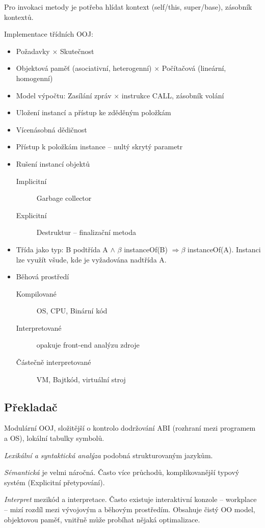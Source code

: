 \documentclass[a4paper, 11pt]{report}
\begin{document}
Pro invokaci metody je potřeba hlídat kontext (self/this, super/base), zásobník kontextů.

Implementace třídních OOJ:
\begin{itemize}
	\item Požadavky $\times$ Skutečnost
	\item Objektová paměť (asociativní, heterogenní) $\times$ Počítačová (lineární, homogenní)
	\item Model výpočtu: Zasílání zpráv $\times$ instrukce CALL, zásobník volání
	\item Uložení instancí a přístup ke zděděným položkám
	\item Vícenásobná dědičnost
	\item Přístup k položkám instance -- nultý skrytý parametr
	\item Rušení instancí objektů
	\begin{description}
		\item[Implicitní] Garbage collector
		\item[Explicitní] Destruktur -- finalizační metoda
	\end{description}
	\item Třída jako typ: B podtřída A $\land$ $\beta$ instanceOf(B) $ \Rightarrow \beta $ instanceOf(A). Instanci lze využít všude, kde je vyžadována nadtřída A. 
	\item Běhová prostředí
	\begin{description}
		\item[Kompilované] OS, CPU, Binární kód
		\item[Interpretované] opakuje front-end analýzu zdroje
		\item[Částečně interpretované] VM, Bajtkód, virtuální stroj
	\end{description}
\end{itemize}

\subsection{Překladač}
Modulární OOJ, složitější o kontrolo dodržování ABI (rozhraní mezi programem a OS), lokální tabulky symbolů.

\emph{Lexikální a syntaktická analýza} podobná strukturovaným jazykům.

\emph{Sémantická} je velmi náročná. Často více průchodů, komplikovanější typový systém (Explicitní přetypování).

\emph{Interpret} mezikód a interpretace. Často existuje interaktivní konzole -- workplace -- mizí rozdíl mezi vývojovým a běhovým prostředím. Obsahuje čistý OO model, objektovou paměť, vnitřně může probíhat nějaká optimalizace.
\end{document}
